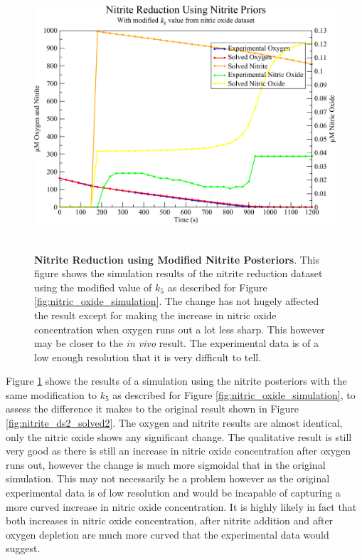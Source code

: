 \begin{figure}[tbp]
 \centering
 \includegraphics[height=10cm]{./07-nitritereduction/data/nitrite_dataset.pdf}
 \caption[Nitrite Reduction using Modified Nitrite Posteriors]{{\bf Nitrite Reduction using Modified Nitrite Posteriors}. This figure shows the simulation results of the nitrite reduction dataset using the modified value of $k_5$ as described for Figure \ref{fig:nitric_oxide_simulation}. The change has not hugely affected the result except for making the increase in nitric oxide concentration when oxygen runs out a lot less sharp. This however may be closer to the \textit{in vivo} result. The experimental data is of a low enough resolution that it is very difficult to tell.
 \label{fig:nitrite_simulation}}
\end{figure}

Figure \ref{fig:nitrite_simulation} shows the results of a simulation using the nitrite posteriors with the same modification to $k_5$ as described for Figure \ref{fig:nitric_oxide_simulation}, to assess the difference it makes to the original result shown in Figure \ref{fig:nitrite_ds2_solved2}. The oxygen and nitrite results are almost identical, only the nitric oxide shows any significant change. The qualitative result is still very good as there is still an increase in nitric oxide concentration after oxygen runs out, however the change is much more sigmoidal that in the original simulation. This may not necessarily be a problem however as the original experimental data is of low resolution and would be incapable of capturing a more curved increase in nitric oxide concentration. It is highly likely in fact that both increases in nitric oxide concentration, after nitrite addition and after oxygen depletion are much more curved that the experimental data would suggest.

